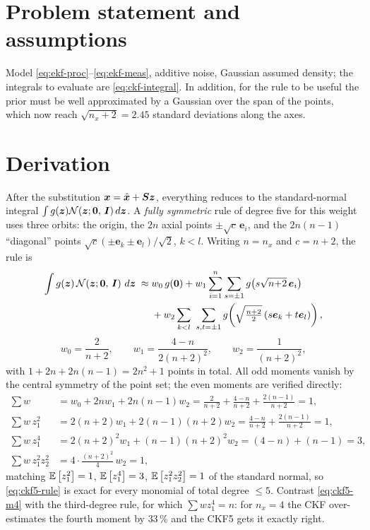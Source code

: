 \section{Problem statement and assumptions}
Model \eqref{eq:ekf-proc}--\eqref{eq:ekf-meas}, additive noise, Gaussian assumed density; the
integrals to evaluate are \eqref{eq:ckf-integral}. In addition, for the rule to be useful the
prior must be well approximated by a Gaussian over the span of the points, which now reach
$\sqrt{n_x+2} = 2.45$ standard deviations along the axes.

\section{Derivation}
After the substitution $\bm{x} = \hat{\bm{x}} + \bm{S}\bm{z}$, everything reduces to the standard-normal
integral $\int g(\bm{z})\mathcal{N}\!\left(\bm{z};\bm{0},\,\bm{I}\right)d\bm{z}$. A \emph{fully symmetric} rule of degree five
for this weight uses three orbits: the origin, the $2n$ axial points $\pm\sqrt{c}\,\bm{e}_i$,
and the $2n(n-1)$ ``diagonal'' points $\sqrt{c}(\pm\bm{e}_k\pm\bm{e}_l)/\sqrt2$, $k<l$. Writing
$n = n_x$ and $c = n+2$, the rule is
\begin{align}
\int g(\bm{z})\,\mathcal{N}\!\left(\bm{z};\bm{0},\,\bm{I}\right)\,d\bm{z} \;\approx\;
& w_0\, g(\bm{0})
+ w_1 \sum_{i=1}^{n}\sum_{s=\pm1} g\!\left(s\sqrt{n{+}2}\,\bm{e}_i\right) \nonumber\\
&+ w_2 \sum_{k<l}\ \sum_{s,t=\pm1} g\!\left(\sqrt{\tfrac{n+2}{2}}\,(s\bm{e}_k + t\bm{e}_l)\right),
\label{eq:ckf5-rule}
\end{align}
\begin{equation}
w_0 = \frac{2}{n+2}, \qquad
w_1 = \frac{4-n}{2(n+2)^2}, \qquad
w_2 = \frac{1}{(n+2)^2},
\label{eq:ckf5-weights}
\end{equation}
with $1 + 2n + 2n(n-1) = 2n^2+1$ points in total. All odd moments vanish by the central
symmetry of the point set; the even moments are verified directly:
\begin{align}
\textstyle\sum w &= w_0 + 2n w_1 + 2n(n-1) w_2 = \frac{2}{n+2} + \frac{4-n}{n+2} + \frac{2(n-1)}{n+2} = 1,
\label{eq:ckf5-m0}\\
\textstyle\sum w\,z_1^2 &= 2(n{+}2)w_1 + 2(n{-}1)(n{+}2)w_2 = \frac{4-n}{n+2}+\frac{2(n-1)}{n+2} = 1,
\label{eq:ckf5-m2}\\
\textstyle\sum w\,z_1^4 &= 2(n{+}2)^2 w_1 + (n{-}1)(n{+}2)^2 w_2 = (4-n) + (n-1) = 3,
\label{eq:ckf5-m4}\\
\textstyle\sum w\,z_1^2z_2^2 &= 4\cdot\tfrac{(n+2)^2}{4}\,w_2 = 1,
\label{eq:ckf5-m22}
\end{align}
matching $\mathbb{E}\left[z_1^2\right]=1$, $\mathbb{E}\left[z_1^4\right]=3$, $\mathbb{E}\left[z_1^2z_2^2\right]=1$ of the standard normal, so
\eqref{eq:ckf5-rule} is exact for every monomial of total degree $\le5$. Contrast
\eqref{eq:ckf5-m4} with the third-degree rule, for which $\sum w z_1^4 = n$: for $n_x = 4$ the
CKF over-estimates the fourth moment by $33\,\%$ and the CKF5 gets it exactly right.

